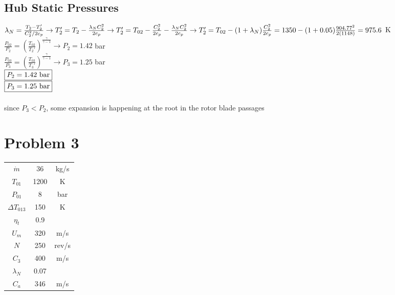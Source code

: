 \documentclass{article}
\begin{document}
\subsection*{Hub Static Pressures}
$\lambda_N=\frac{T_2-T_2'}{C_2^2/2c_p} \rightarrow T_2'=T_2-\frac{\lambda_N C_2^2}{2c_p} \rightarrow
T_2'=T_{02}-\frac{C_2^2}{2c_p}-\frac{\lambda_N C_2^2}{2c_p} \rightarrow \\
T_2'=T_{02}-(1+\lambda_N)\frac{C_2^2}{2c_p}=1350-(1+0.05)\frac{904.77^2}{2(1148)}=975.6$ K \\
$\frac{P_{02}}{P_2}=(\frac{T_{02}}{T_2'})^\frac{\gamma}{\gamma-1} \rightarrow P_2=1.42$ bar \\
$\frac{P_{03}}{P_3}=(\frac{T_{03}}{T_3'})^\frac{\gamma}{\gamma-1} \rightarrow P_3=1.25$ bar \\
$\fbox{$P_2=1.42$ bar}$ \\
$\fbox{$P_3=1.25$ bar}$ \\\\
since $P_3<P_2$, some expansion is happening at the root in the rotor blade passages

\section*{Problem 3}
\begin{tabular}{ccc}
    $\dot{m}$ & 36 & kg/s \\
    $T_{01}$ & 1200 & K \\
    $P_{01}$ & 8 & bar \\
    $\Delta T_{013}$ & 150 & K \\
    $\eta_t$ & 0.9 \\
    $U_m$ & 320 & m/s \\
    $N$ & 250 & rev/s \\
    $C_3$ & 400 & m/s \\
    $\lambda_N$ & 0.07 \\
    $C_a$ & 346 & m/s
\end{tabular}
\end{document}
